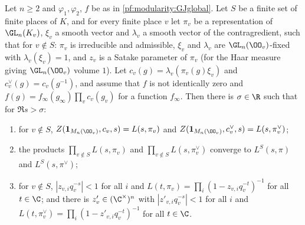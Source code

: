\begin{theorem}\label{pf:modularity:exunr}
Let $n\ge2$ and $\varphi_1,\varphi_2$, $f$ be as in \cref{pf:modularity:GJglobal}. Let $S$ be a finite set of finite places
of $K$, and for every finite place $v$ let $\pi_v$ be a representation of $\GL_n(K_v)$, $\xi_v$ a smooth vector and
$\lambda_v$ a smooth vector of the contragredient, such that for $v\notin S$: $\pi_v$ is irreducible and admissible, $\xi_v$
and $\lambda_v$ are $\GL_n(\OO_v)$-fixed with $\lambda_v(\xi_v)=1$, and $z_v$ is a Satake parameter of $\pi_v$ (for the
Haar measure giving $\GL_n(\OO_v)$ volume $1$). Let $c_v(g)=\lambda_v(\pi_v(g)\xi_v)$ and $c_v^\vee(g)=c_v(g^{-1})$, and
assume that $f$ is not identically zero and $f(g)=f_\infty(g_\infty)\prod_vc_v(g_v)$ for a function $f_\infty$. Then there
is $\sigma\in\R$ such that for $\Re s>\sigma$:
\begin{enumerate}[label=(\alph*)]
\item for $v\notin S$, $Z(\mathbf 1_{M_n(\OO_v)},c_v,s)=L(s,\pi_v)$ and $Z(\mathbf 1_{M_n(\OO_v)},c_v^\vee,s)=L(s,\pi_v^\vee)$;
\item the products $\prod_{v\notin S}L(s,\pi_v)$ and $\prod_{v\notin S}L(s,\pi_v^\vee)$ converge to $L^S(s,\pi)$ and
$L^S(s,\pi^\vee)$;
\item for $v\notin S$, $|z_{v,i}q_v^{-s}|<1$ for all $i$ and $L(t,\pi_v)=\prod_i(1-z_{v,i}q_v^{-t})^{-1}$ for all $t\in\C$;
and there is $z'_v\in(\C^\times)^n$ with $|z'_{v,i}q_v^{-s}|<1$ for all $i$ and
$L(t,\pi_v^\vee)=\prod_i(1-z'_{v,i}q_v^{-t})^{-1}$ for all $t\in\C$.
\end{enumerate}
\end{theorem}

